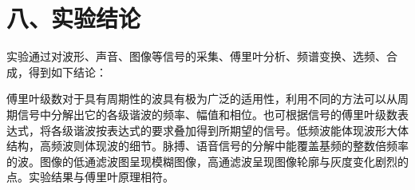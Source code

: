 \documentclass[11pt]{article}
\begin{document}
\section*{八、实验结论}

实验通过对波形、声音、图像等信号的采集、傅里叶分析、频谱变换、选频、合成，得到如下结论：

傅里叶级数对于具有周期性的波具有极为广泛的适用性，利用不同的方法可以从周期信号中分解出它的各级谐波的频率、幅值和相位。也可根据信号的傅里叶级数表达式，将各级谐波按表达式的要求叠加得到所期望的信号。低频波能体现波形大体结构，高频波则体现波的细节。脉搏、语音信号的分解中能覆盖基频的整数倍频率的波。图像的低通滤波图呈现模糊图像，高通滤波呈现图像轮廓与灰度变化剧烈的点。实验结果与傅里叶原理相符。
\end{document}
